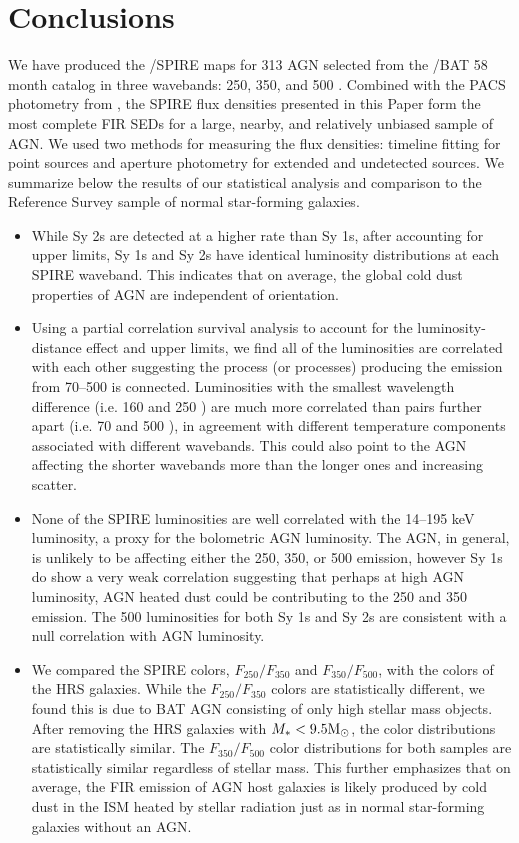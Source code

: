\section{Conclusions}
We have produced the \herschel/SPIRE maps for 313 AGN selected from the \swift/BAT 58 month catalog in three wavebands: 250, 350, and 500 \um. Combined with the PACS photometry from \citet{Melendez:2014yu}, the SPIRE flux densities presented in this Paper form the most complete FIR SEDs for a large, nearby, and relatively unbiased sample of AGN. We used two methods for measuring the flux densities: timeline fitting for point sources and aperture photometry for extended and undetected sources. We summarize below the results of our statistical analysis and comparison to the \herschel{} Reference Survey sample of normal star-forming galaxies.
\begin{itemize}
\item While Sy 2s are detected at a higher rate than Sy 1s, after accounting for upper limits, Sy 1s and Sy 2s have identical luminosity distributions at each SPIRE waveband. This indicates that on average, the global cold dust properties of AGN are independent of orientation.

\item Using a partial correlation survival analysis to account for the luminosity-distance effect and upper limits, we find all of the \herschel{} luminosities are correlated with each other suggesting the process (or processes) producing the emission from 70--500 \um{} is connected. Luminosities with the smallest wavelength difference (i.e. 160 and 250 \um) are much more correlated than pairs further apart (i.e. 70 and 500 \um), in agreement with different temperature components associated with different wavebands. This could also point to the AGN affecting the shorter wavebands more than the longer ones and increasing scatter.

\item None of the SPIRE luminosities are well correlated with the 14--195 keV luminosity, a proxy for the bolometric AGN luminosity. The AGN, in general, is unlikely to be affecting either the 250, 350, or 500 \um emission, however Sy 1s do show a very weak correlation suggesting that perhaps at high AGN luminosity, AGN heated dust could be contributing to the 250 and 350 \um{} emission. The 500 \um{} luminosities for both Sy 1s and Sy 2s are consistent with a null correlation with AGN luminosity.

\item We compared the SPIRE colors, $F_{250}/F_{350}$ and $F_{350}/F_{500}$, with the colors of the HRS galaxies. While the $F_{250}/F_{350}$ colors are statistically different, we found this is due to BAT AGN consisting of only high stellar mass objects. After removing the HRS galaxies with $M_{*} < 9.5 \rm{M_{\odot}}$, the color distributions are statistically similar. The $F_{350}/F_{500}$ color distributions for both samples are statistically similar regardless of stellar mass. This further emphasizes that on average, the FIR emission of AGN host galaxies is likely produced by cold dust in the ISM heated by stellar radiation just as in normal star-forming galaxies without an AGN.


\end{itemize}

